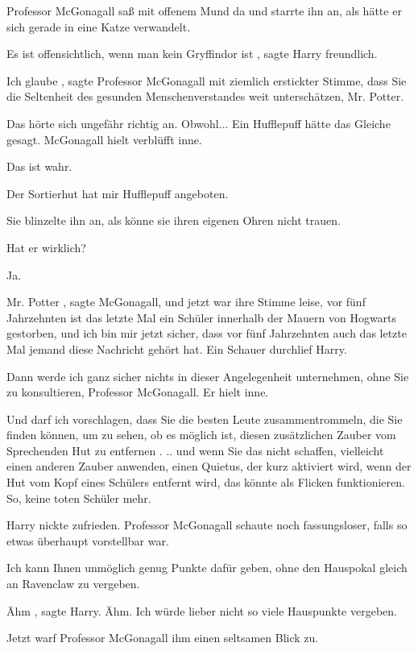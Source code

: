 Professor McGonagall saß mit offenem Mund da und starrte ihn an, als hätte er
sich gerade in eine Katze verwandelt.

\glqq Es ist offensichtlich, wenn man kein Gryffindor ist\grqq{} , sagte Harry
freundlich.

\glqq Ich glaube\grqq{} , sagte Professor McGonagall mit ziemlich erstickter
Stimme, \glqq dass Sie die Seltenheit des gesunden Menschenverstandes weit
unterschätzen, Mr. Potter.\grqq{}

Das hörte sich ungefähr richtig an. Obwohl... \glqq Ein Hufflepuff hätte das
Gleiche gesagt.\grqq{} McGonagall hielt verblüfft inne.

\glqq Das ist wahr.\grqq{}

\glqq Der Sortierhut hat mir Hufflepuff angeboten.\grqq{}

Sie blinzelte ihn an, als könne sie ihren eigenen Ohren nicht trauen.

\glqq Hat er wirklich?\grqq{}

\glqq Ja.\grqq{}

\glqq Mr. Potter\grqq{} , sagte McGonagall, und jetzt war ihre Stimme leise,
\glqq vor fünf Jahrzehnten ist das letzte Mal ein Schüler innerhalb der Mauern
von Hogwarts gestorben, und ich bin mir jetzt sicher, dass vor fünf Jahrzehnten
auch das letzte Mal jemand diese Nachricht gehört hat.\grqq{} Ein Schauer
durchlief Harry.

\glqq Dann werde ich ganz sicher nichts in dieser Angelegenheit unternehmen,
ohne Sie zu konsultieren, Professor McGonagall.\grqq{} Er hielt inne.

\glqq Und darf ich vorschlagen, dass Sie die besten Leute zusammentrommeln, die
Sie finden können, um zu sehen, ob es möglich ist, diesen zusätzlichen Zauber
vom Sprechenden Hut zu entfernen . .. und wenn Sie das nicht schaffen,
vielleicht einen anderen Zauber anwenden, einen Quietus, der kurz aktiviert
wird, wenn der Hut vom Kopf eines Schülers entfernt wird, das könnte als Flicken
funktionieren. So, keine toten Schüler mehr.\grqq{}

Harry nickte zufrieden. Professor McGonagall schaute noch fassungsloser, falls
so etwas überhaupt vorstellbar war.

\glqq Ich kann Ihnen unmöglich genug Punkte dafür geben, ohne den Hauspokal
gleich an Ravenclaw zu vergeben.\grqq{}

\glqq Ähm\grqq{} , sagte Harry. \glqq Ähm. Ich würde lieber nicht so viele
Hauspunkte vergeben.\grqq{}

Jetzt warf Professor McGonagall ihm einen seltsamen Blick zu.

